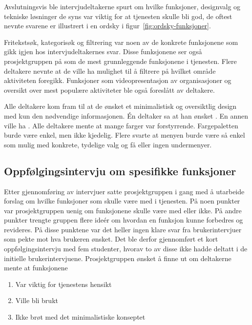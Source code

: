 Avslutningsvis ble intervjudeltakerne spurt om hvilke funksjoner, designvalg og tekniske løsninger de syns var viktig for at tjenesten skulle bli god, de oftest nevnte svarene er illustrert i en ordsky i figur~\ref{fig:ordsky-funksjoner}. 

Fritekstsøk, kategorisøk og filtrering var noen av de konkrete funksjonene som gikk igjen hos intervjudeltakernes svar. Disse funksjonene ser også prosjektgruppen på som de mest grunnleggende funksjonene i tjenesten. Flere deltakere nevnte at de ville ha mulighet til å filtrere på hvilket område aktiviteten foregikk. Funksjoner som videopresentasjon av organisasjoner og oversikt over mest populære aktiviteter ble også foreslått av deltakere.

Alle deltakere kom fram til at de ønsket et minimalistisk og oversiktlig design med kun den nødvendige informasjonen. Én deltaker sa at han ønsket . En annen ville ha . Alle deltakere mente at mange farger var forstyrrende. Fargepaletten burde være enkel, men ikke kjedelig. Flere svarte at menyen burde være så enkel som mulig med konkrete, tydelige valg og få eller ingen undermenyer.

\subsection{Oppfølgingsintervju om spesifikke funksjoner}
Etter gjennomføring av intervjuer satte prosjektgruppen i gang med å utarbeide forslag om hvilke funksjoner som skulle være med i tjenesten. På noen punkter var prosjektgruppen uenig om funksjonene skulle være med eller ikke. På andre punkter trengte gruppen flere ideér om hvordan en funksjon kunne forbedres og revideres. På disse punktene var det heller ingen klare svar fra brukerintervjuer som pekte mot hva brukeren ønsket. Det ble derfor gjennomført et kort oppfølgingsintervju med fem studenter, hvorav to av disse ikke hadde deltatt i de initielle brukerintervjuene. Prosjektgruppen ønsket å finne ut om deltakerne mente at funksjonene

\begin{enumerate}
\item Var viktig for tjenestens hensikt
\item Ville bli brukt
\item Ikke brøt med det minimalistiske konseptet
\end{enumerate}

